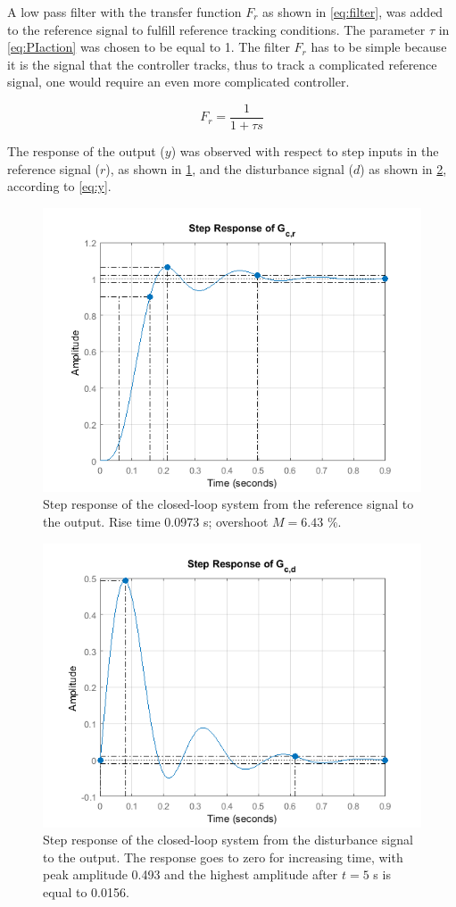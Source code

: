 \documentclass[a4paper]{article}
\begin{document}
A low pass filter with the transfer function $F_r$ as shown in \cref{eq:filter}, was added to the reference signal to fulfill reference tracking conditions. The parameter $\tau$ in \cref{eq:PIaction} was chosen to be equal to 1. The filter $F_r$ has to be simple because it is the signal that the controller tracks, thus to track a complicated reference signal, one would require an even more complicated controller. 

\begin{equation}
F_r=\frac{1}{1+\tau s}
\label{eq:filter}
\end{equation}

The response of the output ($y$) was observed with respect to step inputs in the reference signal ($r$), as shown in \cref{fig:stepresponse_ytor}, and the disturbance signal ($d$) as shown in \cref{fig:stepresponse_ytod}, according to \cref{eq:y}.

\begin{figure}[!ht]
\centering
\includegraphics[width=.8\linewidth]{Gcr_423}
\caption{Step response of the closed-loop system from the reference signal to the output. Rise time 0.0973 s; overshoot $M=6.43$ \%.}
\label{fig:stepresponse_ytor}
\end{figure}

\begin{figure}[!ht]
\centering
\includegraphics[width=.8\linewidth]{Gcd_423}
\caption{Step response of the closed-loop system from the disturbance signal to the output. The response goes to zero for increasing time, with peak amplitude 0.493 and the highest amplitude after $t=5$ s is equal to 0.0156.}
\label{fig:stepresponse_ytod}
\end{figure}
\end{document}
